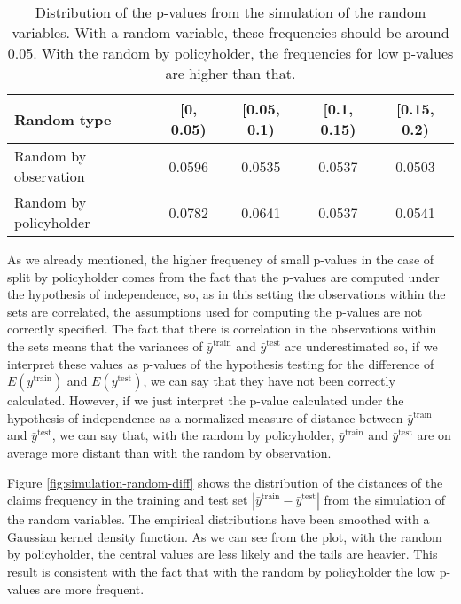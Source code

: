 \documentclass[a4paper, twoside, openright, 12pt]{report}
\theoremstyle{definition}
\theoremstyle{definition}
\theoremstyle{definition}
\theoremstyle{remark}
\begin{document}
\begin{table}[!h]

\caption[Distribution of the p-values from the simulation of the random variables.]{\label{tab:simulation-random}Distribution of the p-values from the simulation of the random variables. With a random variable, these frequencies should be around 0.05. With the random by policyholder, the frequencies for low p-values are higher than that.}
\centering
\begin{tabular}[t]{lcccc}
\toprule
\textbf{Random type} & \textbf{[0, 0.05)} & \textbf{[0.05, 0.1)} & \textbf{[0.1, 0.15)} & \textbf{[0.15, 0.2)}\\
\midrule[\heavyrulewidth]
Random by observation & 0.0596 & 0.0535 & 0.0537 & 0.0503\\
Random by policyholder & 0.0782 & 0.0641 & 0.0537 & 0.0541\\
\bottomrule
\end{tabular}
\end{table}

As we already mentioned, the higher frequency of small p-values in the case of split by policyholder comes from the fact that the p-values are computed under the hypothesis of independence, so, as in this setting the observations within the sets are correlated, the assumptions used for computing the p-values are not correctly specified. The fact that there is correlation in the observations within the sets means that the variances of \(\bar{y}^{\text{train}}\) and \(\bar{y}^{\text{test}}\) are underestimated so, if we interpret these values as p-values of the hypothesis testing for the difference of \(E(y^{\text{train}})\) and \(E(y^{\text{test}})\), we can say that they have not been correctly calculated. However, if we just interpret the p-value calculated under the hypothesis of independence as a normalized measure of distance between \(\bar{y}^{\text{train}}\) and \(\bar{y}^{\text{test}}\), we can say that, with the random by policyholder, \(\bar{y}^{\text{train}}\) and \(\bar{y}^{\text{test}}\) are on average more distant than with the random by observation.

Figure \ref{fig:simulation-random-diff} shows the distribution of the distances of the claims frequency in the training and test set \(\left|\bar{y}^\text{train} - \bar{y}^\text{test}\right|\) from the simulation of the random variables. The empirical distributions have been smoothed with a Gaussian kernel density function. As we can see from the plot, with the random by policyholder, the central values are less likely and the tails are heavier. This result is consistent with the fact that with the random by policyholder the low p-values are more frequent.
\end{document}

